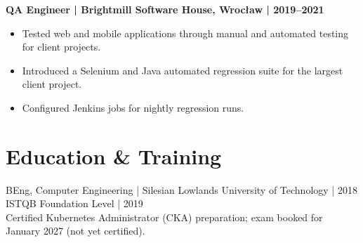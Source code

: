 \documentclass[11pt,a4paper]{article}
\begin{document}
\textbf{QA Engineer | Brightmill Software House, Wrocław | 2019--2021}
\begin{itemize}
\item Tested web and mobile applications through manual and automated testing for client projects.
\item Introduced a Selenium and Java automated regression suite for the largest client project.
\item Configured Jenkins jobs for nightly regression runs.
\end{itemize}

\section*{Education \& Training}
BEng, Computer Engineering | Silesian Lowlands University of Technology | 2018\\
ISTQB Foundation Level | 2019\\
Certified Kubernetes Administrator (CKA) preparation; exam booked for January 2027 (not yet certified).
\end{document}
